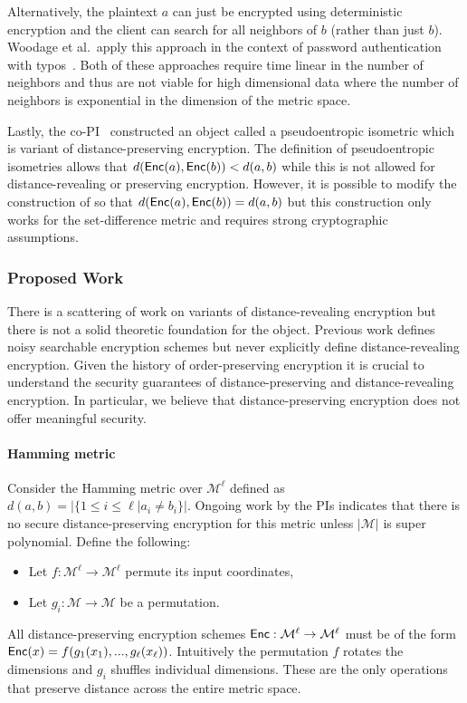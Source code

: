 Alternatively, the plaintext $a$ can just be encrypted using deterministic encryption and the client can search for all neighbors of $b$ (rather than just $b$).  Woodage et al.~apply this approach in the context of password authentication with typos~\cite{C:WCDJR17}.  Both of these approaches require time linear in the number of neighbors and thus are not viable for high dimensional data where the number of neighbors is exponential in the dimension of the metric space.

Lastly, the co-PI~\cite{EPRINT:ABCFG16} constructed an object called a pseudoentropic isometric which is variant of distance-preserving encryption.  The definition of pseudoentropic isometries allows that $d(\mathsf{Enc}(a), \mathsf{Enc}(b)) <d(a,b)$ while this is not allowed for distance-revealing or preserving encryption.  However, it is possible to modify the construction of \cite{EPRINT:ABCFG16} so that $d(\mathsf{Enc}(a), \mathsf{Enc}(b)) = d(a,b)$ but this construction only works for the set-difference metric and requires strong cryptographic assumptions.

\subsubsection{Proposed Work}
There is a scattering of work on variants of distance-revealing encryption but there is not a solid theoretic foundation for the object.  Previous work defines noisy searchable encryption schemes but never explicitly define distance-revealing encryption.   Given the history of order-preserving encryption it is crucial to understand the security guarantees of distance-preserving and distance-revealing encryption.  In particular, we believe that distance-preserving encryption does not offer meaningful security.

 \paragraph{Hamming metric} Consider the Hamming metric over $\mathcal{M}^\ell$ defined as $d(a,b) = | \{ 1\le i\le \ell | a_i \neq b_i\}|$.  Ongoing work by the PIs indicates that there is no secure distance-preserving encryption for this metric unless $|\mathcal{M}|$ is super polynomial.  Define the following: 
\begin{itemize}
\item Let $f: \mathcal{M}^\ell \rightarrow \mathcal{M}^\ell$ permute its input coordinates, 
\item Let $g_i: \mathcal{M}\rightarrow \mathcal{M}$ be a permutation.
\end{itemize}
All distance-preserving encryption schemes $\mathsf{Enc}: \mathcal{M}^\ell\rightarrow \mathcal{M}^\ell$ must be of the form $\mathsf{Enc}(x) = f(g_1(x_1),..., g_\ell(x_\ell))$.  Intuitively the permutation $f$ rotates the dimensions and $g_i$ shuffles individual dimensions.  These are the only operations that preserve distance across the entire metric space.


